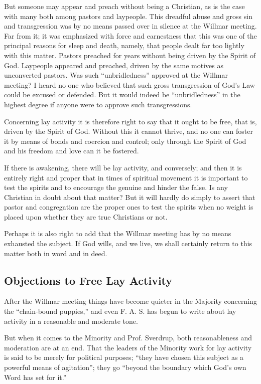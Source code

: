 But someone may appear and preach without being a Christian, as is the case with many both among pastors and laypeople. This dreadful abuse and gross sin and transgression was by no means passed over in silence at the Willmar meeting. Far from it; it was emphasized with force and earnestness that this was one of the principal reasons for sleep and death, namely, that people dealt far too lightly with this matter. Pastors preached for years without being driven by the Spirit of God. Laypeople appeared and preached, driven by the same motives as unconverted pastors. Was such “unbridledness” approved at the Willmar meeting? I heard no one who believed that such gross transgression of God’s Law could be excused or defended. But it would indeed be “unbridledness” in the highest degree if anyone were to approve such transgressions.

Concerning lay activity it is therefore right to say that it ought to be free, that is, driven by the Spirit of God. Without this it cannot thrive, and no one can foster it by means of bonds and coercion and control; only through the Spirit of God and his freedom and love can it be fostered.

If there is awakening, there will be lay activity, and conversely; and then it is entirely right and proper that in times of spiritual movement it is important to test the spirits and to encourage the genuine and hinder the false. Is any Christian in doubt about that matter? But it will hardly do simply to assert that pastor and congregation are the proper ones to test the spirits when no weight is placed upon whether they are true Christians or not.

Perhaps it is also right to add that the Willmar meeting has by no means exhausted the subject. If God wills, and we live, we shall certainly return to this matter both in word and in deed.

\subsection{Objections to Free Lay Activity}

After the Willmar meeting things have become quieter in the Majority concerning the “chain-bound puppies,” and even F. A. S. has begun to write about lay activity in a reasonable and moderate tone.

But when it comes to the Minority and Prof. Sverdrup, both reasonableness and moderation are at an end. That the leaders of the Minority work for lay activity is said to be merely for political purposes; “they have chosen this subject as a powerful means of agitation”; they go “beyond the boundary which God’s own Word has set for it.”

